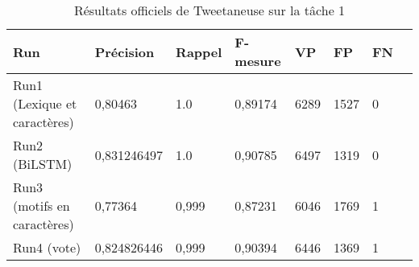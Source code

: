 
\begin{table}[htbp]
  \begin{center}
    \begin{tabular}{l|l|l|l|l|l|l|l}
Run		& Précision	& Rappel& F-mesure	& VP 	&FP 	&FN\\
\hline
\hline
Run1 (Lexique et caractères)  	&0,80463   	& 1.0	& 0,89174 	&6289	&1527	&0\\
Run2 (BiLSTM)	& 0,831246497 	& 1.0	& 0,90785	&6497	&1319	&0\\
Run3 (motifs en caractères)	&0,77364	& 0,999 & 0,87231	&6046	&1769	&1\\
Run4 (vote)&0,824826446  & 0,999	& 0,90394	&6446	&1369	&1\\
\hline

\end{tabular}
\caption{Résultats officiels de Tweetaneuse sur la tâche 1\label{tab:resultats_T1}}
\end{center}
\end{table}
